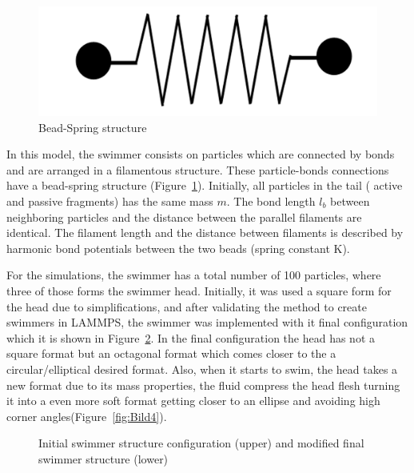 \begin{figure}
\centering
  \begin{footnotesize}
  \includegraphics[scale=0.15]{images/bead-spring.png}
  \caption[Bead-Spring Structure]{Bead-Spring structure}
  \label{fig:Bild2}
  \end{footnotesize}
\end{figure} 

In this model, the swimmer consists on particles which are connected by bonds and are arranged in a filamentous structure. These particle-bonds connections have a bead-spring 
structure (Figure~\ref{fig:Bild2}). Initially, all particles in the tail ( active and passive fragments) has the same mass $m$. The bond length $l_{b}$ between neighboring
particles and the distance between the parallel filaments are identical. The filament length and the distance between filaments is described by harmonic bond potentials between
the two beads (spring constant K).\par

For the simulations, the swimmer has a total number of 100 particles, where three of those forms the swimmer head. Initially, it was used a square form for the head due to
simplifications, and after validating the method to create swimmers in LAMMPS, the swimmer was implemented with it final configuration which it is shown in Figure~\ref{fig:Bild3}.
In the final configuration the head has not a square format but an octagonal format which comes closer to the a circular/elliptical desired format. Also, when it starts to swim, 
the head takes a new format due to its mass properties, the fluid compress the head flesh turning it into a even more soft format getting closer to an ellipse and avoiding high
corner angles(Figure~\ref{fig:Bild4}).\par

\begin{figure}
\centering
  \begin{footnotesize}
  
  \caption[Initial swimmer structure configuration (upper) and modified final swimmer structure (lower)]{Initial swimmer structure configuration (upper) and modified final swimmer structure (lower)}
  \label{fig:Bild3}
  \end{footnotesize}
\end{figure} 


